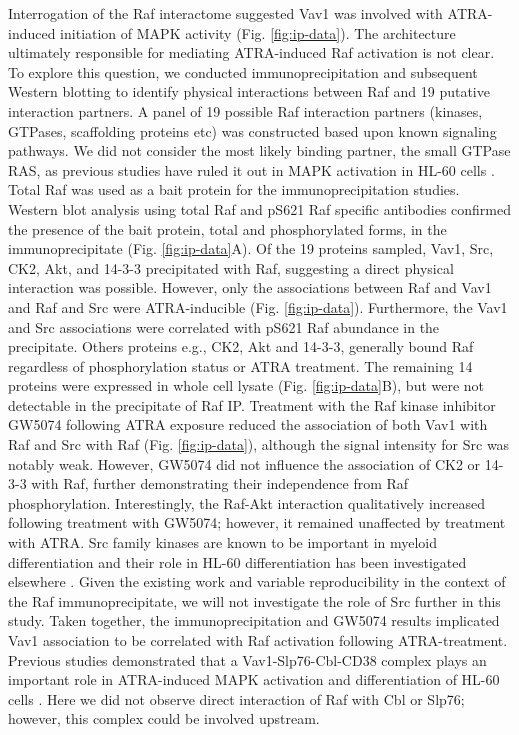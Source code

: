 \documentclass[12pt]{article}
\begin{document}
Interrogation of the Raf interactome suggested Vav1 was involved with ATRA-induced initiation of MAPK activity (Fig. \ref{fig:ip-data}).
The architecture ultimately responsible for mediating ATRA-induced Raf activation is not clear.
To explore this question, we conducted immunoprecipitation and subsequent Western blotting to identify physical interactions between Raf and 19 putative interaction partners.
A panel of 19 possible Raf interaction partners (kinases, GTPases, scaffolding proteins etc)
was constructed based upon known signaling pathways.
We did not consider the most likely binding partner,
the small GTPase RAS, as previous studies have ruled it out in MAPK activation in HL-60 cells \cite{Wang2008,Katagiri1994}.
Total Raf was used as a bait protein for the immunoprecipitation studies.
Western blot analysis using total Raf and pS621 Raf specific antibodies confirmed the
presence of the bait protein, total and phosphorylated forms, in the immunoprecipitate (Fig. \ref{fig:ip-data}A).
Of the 19 proteins sampled, Vav1, Src, CK2, Akt, and 14-3-3 precipitated with Raf, suggesting a direct physical interaction was possible.
However, only the associations between Raf and Vav1 and Raf and Src were ATRA-inducible (Fig. \ref{fig:ip-data}).
Furthermore, the Vav1 and Src associations were correlated with pS621 Raf abundance in the precipitate.
Others proteins e.g., CK2, Akt and 14-3-3, generally bound Raf regardless of phosphorylation status or ATRA treatment.
The remaining 14 proteins were expressed in whole cell lysate (Fig. \ref{fig:ip-data}B),
but were not detectable in the precipitate of Raf IP.
Treatment with the Raf kinase inhibitor GW5074 following ATRA exposure reduced the association of both Vav1 with Raf and Src with Raf (Fig. \ref{fig:ip-data}),
although the signal intensity for Src was notably weak.
However, GW5074 did not influence the association of CK2 or 14-3-3 with Raf, further demonstrating their independence from Raf phosphorylation.
Interestingly, the Raf-Akt interaction qualitatively increased following treatment with GW5074;
however, it remained unaffected by treatment with ATRA.
Src family kinases are known to be important in myeloid differentiation \cite{Miranda2007} and their role in HL-60 differentiation has been investigated elsewhere \cite{Congleton:2012fk}.
Given the existing work and variable reproducibility in the context of the Raf immunoprecipitate,
we will not investigate the role of Src further in this study.
Taken together, the immunoprecipitation and GW5074 results implicated Vav1 association to be correlated with Raf activation following ATRA-treatment.
Previous studies demonstrated that a Vav1-Slp76-Cbl-CD38 complex plays an important role in ATRA-induced MAPK activation and differentiation of HL-60 cells \cite{Shen2009}.
Here we did not observe direct interaction of Raf with Cbl or Slp76;
however, this complex could be involved upstream.
\end{document}
